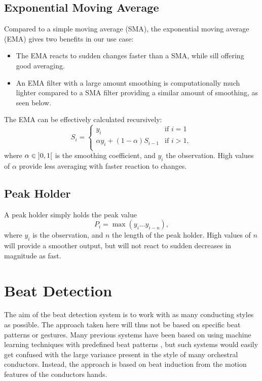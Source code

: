 \subsection{Exponential Moving Average}

Compared to a simple moving average (SMA),
the exponential moving average (EMA)
gives two benefits in our use case:
\begin{itemize}
\item The EMA reacts to sudden changes faster than a SMA,
while sill offering good averaging.
\item An EMA filter with a large amount smoothing is computationally much
lighter compared to a SMA filter providing a similar amount of smoothing,
as seen below.
\end{itemize}
The EMA can be effectively calculated recursively:
\begin{equation}
S_i =
\begin{cases}
y_i & \text{if } i = 1 \\
\alpha y_i + ( 1 - \alpha ) S_{i-1} & \text{if } i > 1, \\
\end{cases}
\end{equation}
where $\alpha \in \mathopen] 0, 1 \mathclose[$ is the smoothing coefficient,
and $y_i$ the \nth[i] observation.
High values of $\alpha$
provide less averaging with faster reaction to changes.

\subsection{Peak Holder}

A peak holder simply holds the peak value
\begin{equation}
P_i = \max \left( y_i \ldots y_{i - n} \right),
\end{equation}
where $y_i$ is the \nth[i] observation,
and $n$ the length of the peak holder.
High values of $n$ will provide a smoother output,
but will not react to sudden decreases in magnitude as fast.

\section{Beat Detection}
\label{sec:beat_detection}

The aim of the beat detection system is
to work with as many conducting styles as possible.
The approach taken here will thus not be
based on specific beat patterns or gestures.
Many previous systems have been based on
using machine learning techniques with
predefined beat patterns \cite{},
but such systems would easily get confused with
the large variance present in the style of
many orchestral conductors.
Instead, the approach is based on beat induction
from the motion features of the conductors hands.

